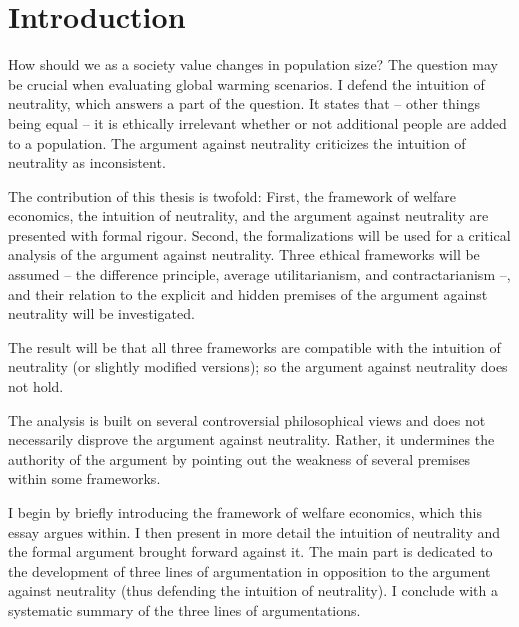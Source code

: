 \chapter*{Introduction}

How should we as a society value changes in population size? The question may be crucial when evaluating global warming scenarios. I defend the intuition of neutrality, which answers a part of the question. It states that – other things being equal – it is ethically irrelevant whether or not additional people are added to a population. The argument against neutrality criticizes the intuition of neutrality as inconsistent. 

The contribution of this thesis is twofold: First, the framework of welfare economics, the intuition of neutrality, and the argument against neutrality are presented with formal rigour. Second, the formalizations will be used for a critical analysis of the argument against neutrality. Three ethical frameworks will be assumed -- the difference principle, average utilitarianism, and contractarianism --, and their relation to the explicit and hidden premises of the argument against neutrality will be investigated. 

The result will be that all three frameworks are compatible with the intuition of neutrality (or slightly modified versions); so the argument against neutrality does not hold. 

The analysis is built on several controversial philosophical views and does not necessarily disprove the argument against neutrality. Rather, it undermines the authority of the argument by pointing out the weakness of several premises within some frameworks.  

I begin by briefly introducing the framework of welfare economics, which this essay argues within. I then present in more detail the intuition of neutrality and the formal argument brought forward against it. The main part is dedicated to the development of three lines of argumentation in opposition to the argument against neutrality (thus defending the intuition of neutrality). I conclude with a systematic summary of the three lines of argumentations. 